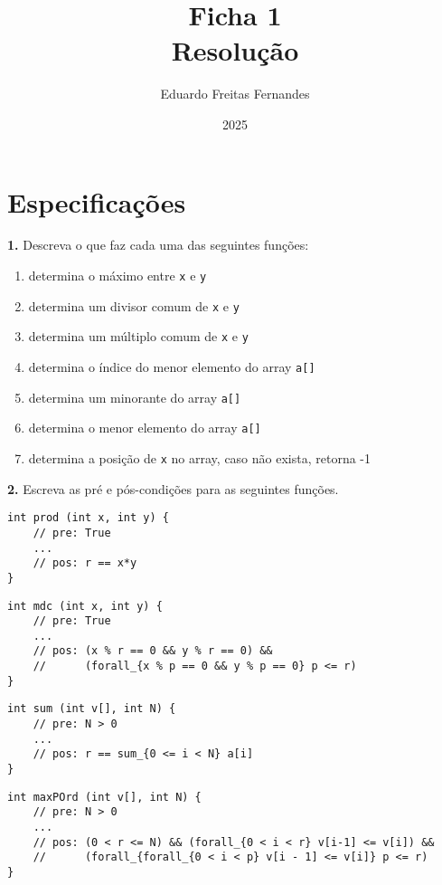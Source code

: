 \documentclass{article}
\title{Ficha 1 \\ Resolução}
\author{Eduardo Freitas Fernandes}
\date{2025}
\begin{document}
\maketitle



\section{Especificações}

\noindent \textbf{1.} Descreva o que faz cada uma das seguintes funções:

\begin{enumerate}[label=\alph*)]
    \item determina o máximo entre \texttt{x} e \texttt{y}
    \item determina um divisor comum de \texttt{x} e \texttt{y}
    \item determina um múltiplo comum de \texttt{x} e \texttt{y}
    \item determina o índice do menor elemento do array \texttt{a[]}
    \item determina um minorante do array \texttt{a[]}
    \item determina o menor elemento do array \texttt{a[]}
    \item determina a posição de \texttt{x} no array, caso não exista, retorna -1
\end{enumerate}

\noindent \textbf{2.} Escreva as pré e pós-condições para as seguintes funções.

\begin{lstlisting}[style=mystyle]
int prod (int x, int y) {
    // pre: True
    ...
    // pos: r == x*y
}
\end{lstlisting}

\begin{lstlisting}[style=mystyle]
int mdc (int x, int y) {
    // pre: True
    ...
    // pos: (x % r == 0 && y % r == 0) &&
    //      (forall_{x % p == 0 && y % p == 0} p <= r)
}
\end{lstlisting}

\begin{lstlisting}[style=mystyle]
int sum (int v[], int N) {
    // pre: N > 0
    ...
    // pos: r == sum_{0 <= i < N} a[i]
}
\end{lstlisting}

\begin{lstlisting}[style=mystyle]
int maxPOrd (int v[], int N) {
    // pre: N > 0
    ...
    // pos: (0 < r <= N) && (forall_{0 < i < r} v[i-1] <= v[i]) &&
    //      (forall_{forall_{0 < i < p} v[i - 1] <= v[i]} p <= r)
}
\end{lstlisting}
\end{document}
